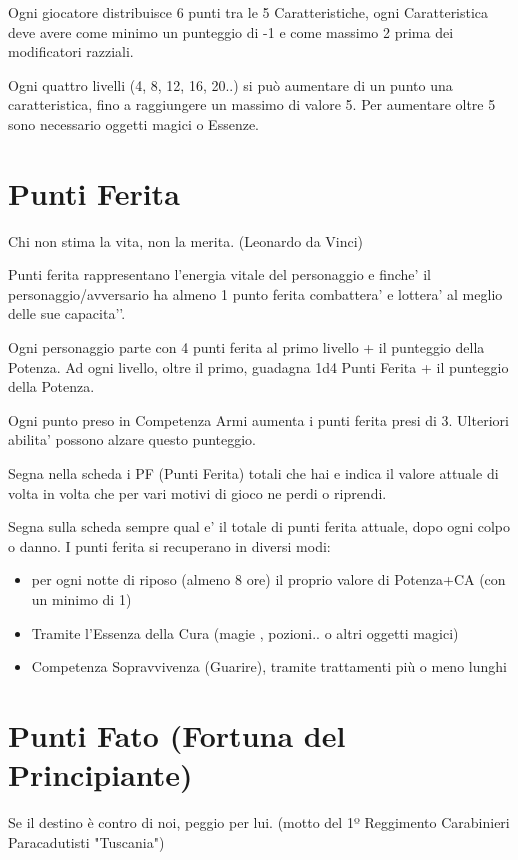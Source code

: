 \documentclass[a4paper,11pt,twoside,openany]{book}
\begin{document}
Ogni giocatore distribuisce 6 punti tra le 5 Caratteristiche, ogni Caratteristica deve avere come minimo un punteggio di -1 e come massimo 2 prima dei modificatori razziali.

Ogni quattro livelli (4, 8, 12, 16, 20..) si può aumentare di un punto una caratteristica, fino a raggiungere un massimo di valore 5. Per aumentare oltre 5 sono necessario oggetti magici o Essenze.


\section{Punti Ferita}

\begin{tcolorbox}[enhanced,arc=5pt,boxrule=0.3pt]{Chi non stima la vita, non la merita. (Leonardo da Vinci)}\end{tcolorbox}\medskip


Punti ferita rappresentano l’energia vitale del personaggio e finche’ il personaggio/avversario ha almeno 1 punto ferita combattera’ e lottera’ al meglio delle sue capacita'’.

Ogni personaggio parte con 4 punti ferita al primo livello + il punteggio della Potenza.
Ad ogni livello, oltre il primo, guadagna 1d4 Punti Ferita + il punteggio della Potenza.

Ogni punto preso in Competenza Armi aumenta i punti ferita presi di 3. Ulteriori abilita’ possono alzare questo punteggio.

Segna nella scheda i PF (Punti Ferita) totali che hai e indica il valore attuale di volta in volta che per vari motivi di gioco ne perdi o riprendi.

Segna sulla scheda sempre qual e’ il totale di punti ferita attuale, dopo ogni colpo o danno.
I punti ferita si recuperano in diversi modi:

\begin{itemize}
	\item
	      per ogni notte di riposo (almeno 8 ore) il proprio valore di Potenza+CA (con un minimo di 1)
	\item
	      Tramite l'Essenza della Cura (magie , pozioni.. o altri oggetti magici)
	\item
	      Competenza Sopravvivenza (Guarire), tramite trattamenti più o meno lunghi
\end{itemize}

\section{Punti Fato (Fortuna del Principiante)}
\begin{tcolorbox}[enhanced,arc=5pt,boxrule=0.3pt]{Se il destino è contro di noi, peggio per lui. (motto del 1º Reggimento Carabinieri Paracadutisti "Tuscania")}\end{tcolorbox}\medskip
\end{document}
